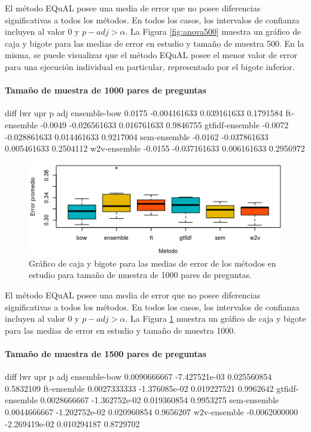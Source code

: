 \bigskip El método EQuAL posee una media de error que no posee diferencias significativas a todos los métodos. En todos los casos, los intervalos de confianza incluyen al valor 0 y \(p-adj > \alpha\). La Figura \ref{fig:anova500} muestra un gráfico de caja y bigote para las medias de error en estudio y tamaño de muestra 500. En la misma, se puede visualizar que el método EQuAL posee el menor valor de error para una ejecución individual en particular, representado por el bigote inferior.

\bigskip
\paragraph{Tamaño de muestra de 1000 pares de preguntas}
\begin{rc}
                  diff          lwr         upr     p adj
ensemble-bow     0.0175 -0.004161633 0.039161633 0.1791584
ft-ensemble     -0.0049 -0.026561633 0.016761633 0.9846755
gtfidf-ensemble -0.0072 -0.028861633 0.014461633 0.9217004
sem-ensemble    -0.0162 -0.037861633 0.005461633 0.2504112
w2v-ensemble    -0.0155 -0.037161633 0.006161633 0.2956972
\end{rc}

\begin{figure}
	\centering
	\includegraphics[width=0.7\linewidth]{10_resultados/imagenes/anova_1000}
	\caption{Gráfico de caja y bigote para las medias de error de los métodos en estudio para tamaño de muestra de 1000 pares de preguntas.}
	\label{fig:anova1000}
\end{figure}

\bigskip El método EQuAL posee una media de error que no posee diferencias significativas a todos los métodos. En todos los casos, los intervalos de confianza incluyen al valor 0 y \(p-adj > \alpha\). La Figura \ref{fig:anova1000} muestra un gráfico de caja y bigote para las medias de error en estudio y tamaño de muestra 1000.

\bigskip
\paragraph{Tamaño de muestra de 1500 pares de preguntas}
\begin{rc}
                        diff           lwr         upr     p adj
ensemble-bow     0.0090666667 -7.427521e-03 0.025560854 0.5832109
ft-ensemble      0.0027333333 -1.376085e-02 0.019227521 0.9962642
gtfidf-ensemble  0.0028666667 -1.362752e-02 0.019360854 0.9953275
sem-ensemble     0.0044666667 -1.202752e-02 0.020960854 0.9656207
w2v-ensemble    -0.0062000000 -2.269419e-02 0.010294187 0.8729702
\end{rc}

